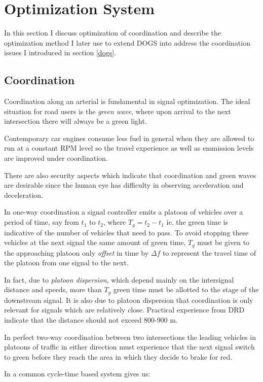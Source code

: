 \section{Optimization System}
\label{optimization}
In this section I discuss optimization of coordination and describe the optimization method I later use to extend DOGS into address the coordination issues I introduced in section \ref{dogs}.

\subsection{Coordination}
\label{coordination}
Coordination along an arterial is fundamental in signal optimization. The ideal situation for road users is the \textit{green wave}, where upon arrival to the next intersection there will always be a green light.

Contemporary car engines consume less fuel in general when they are allowed to run at a constant RPM level so the travel experience as well as emmission levels are improved under coordination.

There are also security aspects which indicate that coordination and green waves are desirable since the human eye has difficulty in observing acceleration and deceleration.

In one-way coordination a signal controller emits a platoon of vehicles over a period of time, say from $t_1$ to $t_2$, where $T_g = t_2 - t_1$ ie. the green time is indicative of the number of vehicles that need to pass. To avoid stopping these vehicles at the next signal the same amount of green time, $T_g$ must be given to the approaching platoon only \textit{offset} in time by $\Delta f$ to represent the travel time of the platoon from one signal to the next. 

In fact, due to \textit{platoon dispersion}, which depend mainly on the intersignal distance and speeds, more than $T_g$ green time must be allotted to the stage of the downstream signal. It is also due to platoon dispersion that coordination is only relevant for signals which are relatively close. Practical experience from DRD indicate that the distance should not exceed 800-900 m. 

In perfect two-way coordination between two intersections the leading vehicles in platoons of traffic in either direction must experience that the next signal switch to green before they reach the area in which they decide to brake for red.

In a common cycle-time based system \cite{coord} gives us:

